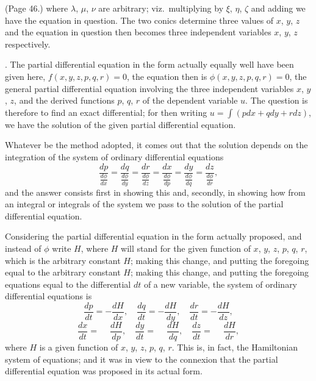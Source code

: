 \documentclass[11pt,a4paper]{article}
\begin{document}
\bigskip

\noindent (Page 46.) where $\lambda$, $\mu$, $\nu$ are arbitrary; viz.\ multiplying by $\xi$, $\eta$, $\zeta$ and adding we have the equation in question. The two conics determine three values of $x$, $y$, $z$ and the equation in question then becomes three independent variables $x$, $y$, $z$ respectively.

\medskip

. The partial differential equation in the form actually equally well have been given here, $f(x, y, z, p, q, r) = 0$, the equation then is $\phi(x, y, z, p, q, r) = 0$, the general partial differential equation involving the three independent variables $x$, $y$, $z$, and the derived functions $p$, $q$, $r$ of the dependent variable $u$. The question is therefore to find an exact differential; for then writing $u = \int (pdx + qdy + rdz)$, we have the solution of the given partial differential equation.

Whatever be the method adopted, it comes out that the solution depends on the integration of the system of ordinary differential equations
\[
\frac{dp}{\frac{d\phi}{dx}} = \frac{dq}{\frac{d\phi}{dy}} = \frac{dr}{\frac{d\phi}{dz}} = \frac{dx}{\frac{d\phi}{dp}} = \frac{dy}{\frac{d\phi}{dq}} = \frac{dz}{\frac{d\phi}{dr}},
\]
and the answer consists first in showing this and, secondly, in showing how from an integral or integrals of the system we pass to the solution of the partial differential equation.

Considering the partial differential equation in the form actually proposed, and instead of $\phi$ write $H$, where $H$ will stand for the given function of $x$, $y$, $z$, $p$, $q$, $r$, which is the arbitrary constant $H$; making this change, and putting the foregoing equal to the arbitrary constant $H$; making this change, and putting the foregoing equations equal to the differential $dt$ of a new variable, the system of ordinary differential equations is
\[
\frac{dp}{dt} = -\frac{dH}{dx},\quad \frac{dq}{dt} = -\frac{dH}{dy},\quad \frac{dr}{dt} = -\frac{dH}{dz},
\]
\[
\frac{dx}{dt} = \phantom{-}\frac{dH}{dp},\quad \frac{dy}{dt} = \phantom{-}\frac{dH}{dq},\quad \frac{dz}{dt} = \phantom{-}\frac{dH}{dr},
\]
where $H$ is a given function of $x$, $y$, $z$, $p$, $q$, $r$. This is, in fact, the Hamiltonian system of equations; and it was in view to the connexion that the partial differential equation was proposed in its actual form.

\bigskip

\end{document}
